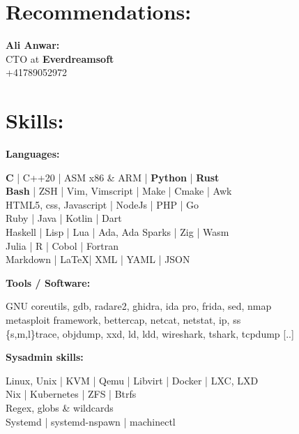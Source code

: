 \documentclass[a4paper,10pt]{article}
\begin{document}
\begin{adjustbox}{valign=t}
\begin{minipage}{0.6\textwidth}
\section*{Recommendations:}
\vspace{-0.2\baselineskip}
\begin{spacing}{0.8}
\begin{description}
	\item{\textbf{Ali Anwar:}}\\
		CTO at \textbf{Everdreamsoft}\\
		+41789052972
\end{description}

\vspace{-4.0\baselineskip}
\end{spacing}
\section*{Skills:}
\begin{description}
\begin{spacing}{0.85}
\item{\textbf{Languages:}}

	\textbf{C} | C++20 | ASM x86 \& ARM | \textbf{Python} | \textbf{Rust} \\
		\textbf{Bash} | ZSH | Vim, Vimscript | Make | Cmake | Awk\\
    HTML5, css, Javascript | NodeJs | PHP | Go\\
    Ruby | Java | Kotlin | Dart\\
    Haskell | Lisp | Lua | Ada, Ada Sparks | Zig | Wasm\\
    Julia | R | Cobol | Fortran \\
    Markdown | \LaTeX | XML | YAML | JSON

\item{\textbf{Tools / Software:}}

    GNU coreutils, gdb, radare2, ghidra, ida pro, frida, sed, nmap\\
    metasploit framework, bettercap, netcat, netstat, ip, ss\\
    \{s,m,l\}trace, objdump, xxd, ld, ldd, wireshark, tshark, tcpdump {[..]}

\item{\textbf{Sysadmin skills:}}

    Linux, Unix | KVM | Qemu | Libvirt | Docker | LXC, LXD\\
    Nix | Kubernetes | ZFS | Btrfs\\
    Regex, globs \& wildcards\\
    Systemd | systemd-nspawn | machinectl


\end{spacing}
\end{description}
\end{minipage}
\end{adjustbox}
\end{document}
